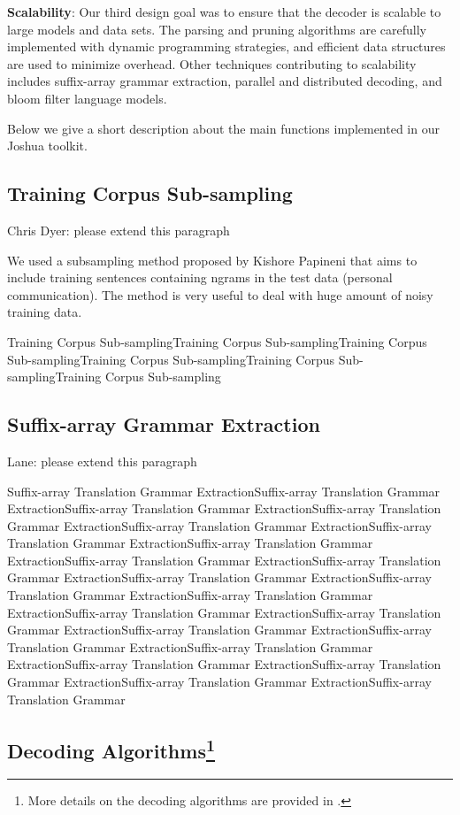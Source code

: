 \documentclass[11pt]{article}
\begin{document}
\textbf{Scalability}: Our third design goal was to ensure that the decoder is scalable to large models and data sets. The parsing and pruning algorithms are carefully implemented with dynamic programming strategies, and efficient data structures are used to minimize overhead. Other techniques contributing to scalability includes suffix-array grammar extraction, parallel and distributed decoding, and bloom filter language models.

Below we give a short description about the main functions implemented in our Joshua toolkit.

\subsection{Training Corpus Sub-sampling}
Chris Dyer: please extend this paragraph


We used a subsampling method proposed by Kishore Papineni that
aims to include training sentences containing ngrams
in the test data (personal communication). The method is very useful to deal with huge amount of noisy training data.

Training Corpus Sub-samplingTraining Corpus Sub-samplingTraining Corpus Sub-samplingTraining Corpus Sub-samplingTraining Corpus Sub-samplingTraining Corpus Sub-sampling

\subsection{Suffix-array Grammar Extraction}
Lane: please extend this paragraph

Suffix-array Translation Grammar ExtractionSuffix-array Translation Grammar ExtractionSuffix-array Translation Grammar ExtractionSuffix-array Translation Grammar ExtractionSuffix-array Translation Grammar ExtractionSuffix-array Translation Grammar ExtractionSuffix-array Translation Grammar ExtractionSuffix-array Translation Grammar ExtractionSuffix-array Translation Grammar ExtractionSuffix-array Translation Grammar ExtractionSuffix-array Translation Grammar ExtractionSuffix-array Translation Grammar ExtractionSuffix-array Translation Grammar ExtractionSuffix-array Translation Grammar ExtractionSuffix-array Translation Grammar ExtractionSuffix-array Translation Grammar ExtractionSuffix-array Translation Grammar ExtractionSuffix-array Translation Grammar ExtractionSuffix-array Translation Grammar ExtractionSuffix-array Translation Grammar ExtractionSuffix-array Translation Grammar

\subsection{Decoding Algorithms\footnote{More details on the decoding algorithms are provided in \cite{zhifei-ssst08}.}}
\end{document}
